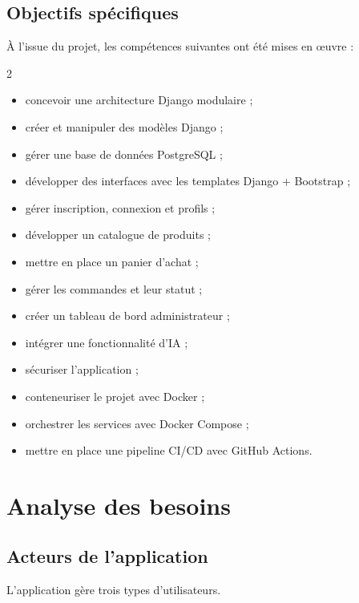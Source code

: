 \documentclass[11pt,a4paper]{report}
\begin{document}
\section{Objectifs spécifiques}
À l'issue du projet, les compétences suivantes ont été mises en œuvre :
\begin{multicols}{2}
\begin{itemize}[leftmargin=1.2em]
  \item concevoir une architecture Django modulaire ;
  \item créer et manipuler des modèles Django ;
  \item gérer une base de données PostgreSQL ;
  \item développer des interfaces avec les templates Django + Bootstrap ;
  \item gérer inscription, connexion et profils ;
  \item développer un catalogue de produits ;
  \item mettre en place un panier d'achat ;
  \item gérer les commandes et leur statut ;
  \item créer un tableau de bord administrateur ;
  \item intégrer une fonctionnalité d'IA ;
  \item sécuriser l'application ;
  \item conteneuriser le projet avec Docker ;
  \item orchestrer les services avec Docker Compose ;
  \item mettre en place une pipeline CI/CD avec GitHub Actions.
\end{itemize}
\end{multicols}

\chapter{Analyse des besoins}

\section{Acteurs de l'application}
L'application gère trois types d'utilisateurs.
\end{document}
